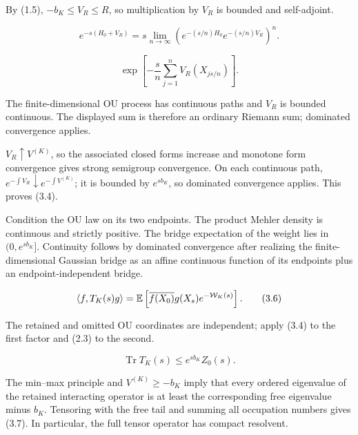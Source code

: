 \documentclass[11pt,a4paper]{article}
\newcommand{\Tr}{\operatorname{Tr}}
\begin{document}

\Because By (1.5), $-b_K\le V_R\le R$, so multiplication by $V_R$ is
bounded and self-adjoint.

\[
 e^{-s(H_0+V_R)}=s\!\!\!\lim_{n\to\infty}
 (e^{-(s/n)H_0}e^{-(s/n)V_R})^n.
\tag{3.5}
\]

\[
 \exp\left[-\frac{s}{n}\sum_{j=1}^nV_R(X_{js/n})\right].
\]


\Because The finite-dimensional OU process has continuous paths and $V_R$ is
bounded continuous.  The displayed sum is therefore an ordinary Riemann sum;
dominated convergence applies.


\Because $V_R\uparrow V^{(K)}$, so the associated closed forms increase and
monotone form convergence gives strong semigroup convergence.  On each continuous
path, $e^{-\int V_R}\downarrow e^{-\int V^{(K)}}$; it is bounded by $e^{sb_K}$,
so dominated convergence applies.  This proves (3.4).


\Because Condition the OU law on its two endpoints.  The product Mehler density is
continuous and strictly positive.  The bridge expectation of the weight lies in
$(0,e^{sb_K}]$.  Continuity follows by dominated convergence after realizing the
finite-dimensional Gaussian bridge as an affine continuous function of its endpoints
plus an endpoint-independent bridge.

\[
 \langle f,T_K(s)g\rangle
 =\mathbb E\left[\overline{f(X_0)}g(X_s)e^{-\mathcal W_K(s)}\right].
\tag{3.6}
\]

\Because The retained and omitted OU coordinates are independent; apply (3.4) to
the first factor and (2.3) to the second.

\[
 \Tr T_K(s)\le e^{sb_K}Z_0(s).
\tag{3.7}
\]

\Because The min--max principle and $V^{(K)}\ge-b_K$ imply that every ordered
eigenvalue of the retained interacting operator is at least the corresponding free
eigenvalue minus $b_K$.  Tensoring with the free tail and summing all occupation
numbers gives (3.7).  In particular, the full tensor operator has compact resolvent.
\end{document}
